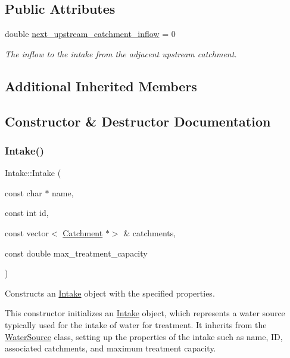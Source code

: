 \subsection*{Public Attributes}
\begin{DoxyCompactItemize}
\item 
double \mbox{\hyperlink{classIntake_a5d28f8899e9d4d61983ad8fdf7d58373}{next\+\_\+upstream\+\_\+catchment\+\_\+inflow}} = 0
\begin{DoxyCompactList}\small\item\em The inflow to the intake from the adjacent upstream catchment. \end{DoxyCompactList}\end{DoxyCompactItemize}
\subsection*{Additional Inherited Members}


\subsection{Constructor \& Destructor Documentation}
\mbox{\label{classIntake_a02e01801fcaede46e960d497e60eb335}} 
\subsubsection{\texorpdfstring{Intake()}{Intake()}\hspace{0.1cm}{\footnotesize\ttfamily [1/4]}}
{\footnotesize\ttfamily Intake\+::\+Intake (\begin{DoxyParamCaption}\item[{const char $\ast$}]{name,  }\item[{const int}]{id,  }\item[{const vector$<$ \mbox{\hyperlink{classCatchment}{Catchment}} $\ast$$>$ \&}]{catchments,  }\item[{const double}]{max\+\_\+treatment\+\_\+capacity }\end{DoxyParamCaption})}



Constructs an \mbox{\hyperlink{classIntake}{Intake}} object with the specified properties. 

This constructor initializes an {\ttfamily \mbox{\hyperlink{classIntake}{Intake}}} object, which represents a water source typically used for the intake of water for treatment. It inherits from the {\ttfamily \mbox{\hyperlink{classWaterSource}{Water\+Source}}} class, setting up the properties of the intake such as name, ID, associated catchments, and maximum treatment capacity.



